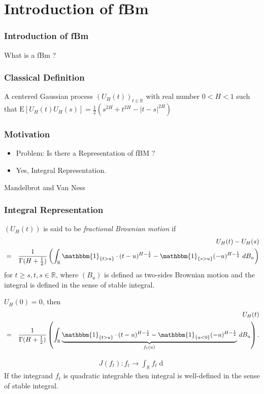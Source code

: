 \documentclass[]{beamer}
\newcommand{\brkt}[1]{\left({#1} \right)}
\begin{document}
\section{Introduction of fBm}
\begin{frame}
\frametitle{Introduction of fBm}
  What is a fBm ?
\end{frame}

\begin{frame}
  \frametitle{Classical Definition}
  A centered Gaussian process $(U_H(t))_{t\in \mathbb{R}}$ with real number $0<H<1$ such that
  $\mathrm{E}[U_H(t)U_H(s)] = \frac{1}{2}(s^{2H} + t^{2H} - |t-s|^{2H})$
\end{frame}

\begin{frame}
  \frametitle{Motivation}
  \begin{itemize}
	\item
	Problem: Is there a Representation of fBM ?
	\vspace{1.5ex}
	\pause
  \item  Yes, Integral Representation.
	\end{itemize}
\end{frame}
\begin{frame}
  Mandelbrot and Van Ness\cite{mandelbrot}
	\frametitle{Integral Representation}
	\begin{definition}
	 $(U_H(t))$ is said to be \emph{fractional Brownian motion} if 
  \begin{eqnarray*}
		&&U_H(t) - U_H(s)\nonumber\\
		&=& \frac{1}{\Gamma(H+\frac{1}{2})}\brkt{\int_{\mathbb{R}} \mathbbm{1}_{\{t > u\}}\cdot (t-u)^{H-\frac{1}{2}}
		- \mathbbm{1}_{\{s > u\}} (-u)^{H-\frac{1}{2}} \, \mathop{dB_u}}
	\label{sec:frtbm}
  \end{eqnarray*}
  for $t\ge s, t, s \in \mathbb{R}$, where $(B_u)$ is defined as two-sides Brownian motion and the integral is defined in the sense of stable integral.
\end{definition}
\end{frame}

\begin{frame}
  \begin{theorem}
	$U_H(0) = 0$, then
	\begin{eqnarray*}
	&&U_H(t) \nonumber\\
	&=& \frac{1}{\Gamma(H+\frac{1}{2})}\brkt{\int_{\mathbb{R}} \underbrace{\mathbbm{1}_{\{t > u\}}\cdot (t-u)^{H-\frac{1}{2}} - \mathbbm{1}_{\{u < 0\}} (-u)^{H-\frac{1}{2}}}_{f_t(u)} \, \mathop{dB_u}}.
	\label{sec:fbm}
  \end{eqnarray*}
\end{theorem}
\begin{eqnarray*}
  J(f_t) : f_t \rightarrow \int_{\mathbb{R}} f_t \mathop{dB_u}
\end{eqnarray*}
  If the integrand $f_t$ is quadratic integrable then integral is well-defined in the sense of stable integral.
\end{frame}
\end{document}
